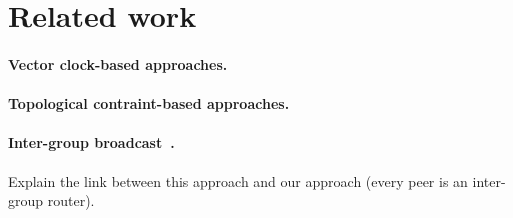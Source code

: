 
\section{Related work}
\label{sec:relatedwork}

\paragraph{Vector clock-based approaches.}
\paragraph{Topological contraint-based approaches.}

\paragraph{Inter-group
  broadcast~\cite{johnson1998scalable,johnson1999intergroup}.} Explain the link
between this approach and our approach (every peer is an inter-group router).


